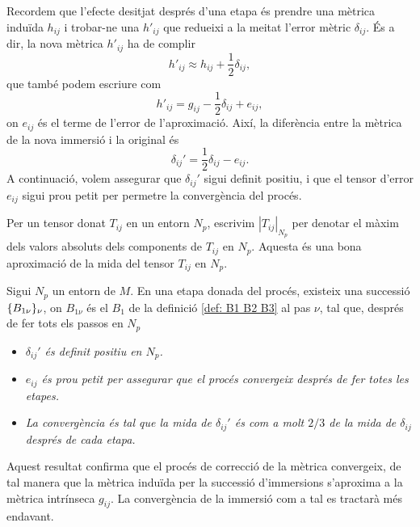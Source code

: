 Recordem que l'efecte desitjat després d'una etapa és prendre una mètrica induïda $h_{ij}$ i trobar-ne una $h'_{ij}$ que redueixi a la meitat l'error mètric $\delta_{ij}$. És a dir, la nova mètrica $h'_{ij}$ ha de complir
\begin{equation*}
    h'_{ij} \approx h_{ij} + \frac12\delta_{ij},
\end{equation*}
que també podem escriure com 
\begin{equation*}
    h'_{ij} = g_{ij} - \frac12\delta_{ij} + e_{ij},
\end{equation*}
on $e_{ij}$ és el terme de l'error de l'aproximació. Així, la diferència entre la mètrica de la nova immersió i la original és
\begin{equation}\label{eq:delta_prima}
    \delta_{ij}' = \frac12\delta_{ij} - e_{ij}.
\end{equation}
A continuació, volem assegurar que $\delta_{ij}'$ sigui definit positiu, i que el tensor d'error $e_{ij}$ sigui prou petit per permetre la convergència del procés.
\begin{nota}
    Per un tensor donat $T_{ij}$ en un entorn $N_p$, escrivim $|T_{ij}|_{N_p}$ per denotar el màxim dels valors absoluts dels components de $T_{ij}$ en $N_p$. Aquesta és una bona aproximació de la mida del tensor $T_{ij}$ en $N_p$.
\end{nota}
\begin{prop}\label{prop:dos de tres}
    Sigui $N_p$ un entorn de $M$. En una etapa donada del procés, existeix una successió $\{B_{1\nu}\}_{\nu}$, on $B_{1\nu}$ és el $B_1$ de la definició \ref{def: B1 B2 B3} al pas $\nu$, tal que, després de fer tots els passos en $N_p$
\end{prop}
\begin{itemize}
    \item \textit{$\delta_{ij}'$ és definit positiu en $N_p$.}
    \item \textit{$e_{ij}$ és prou petit per assegurar que el procés convergeix després de fer totes les etapes.}
    \item \textit{La convergència és tal que la mida de $\delta_{ij}'$ és com a molt $2/3$ de la mida de $\delta_{ij}$ després de cada etapa. }
\end{itemize}
\begin{obs}
    Aquest resultat confirma que el procés de correcció de la mètrica convergeix, de tal manera que la mètrica induïda per la successió d'immersions s'aproxima a la mètrica intrínseca $g_{ij}$.
    La convergència de la immersió com a tal es tractarà més endavant. 
\end{obs}
